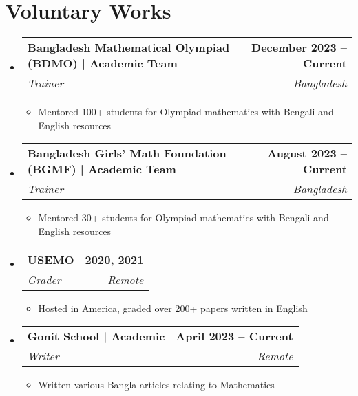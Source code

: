 \documentclass[letterpaper,11pt]{article}
\makeatletter
\newcommand{\resumeItem}[1]{
  \item{
    {#1 \vspace{-2pt}}
  }
}
\newcommand{\resumeSubheading}[4]{
  \vspace{-2pt}\item
    \begin{tabular*}{1.0\textwidth}[t]{l@{\extracolsep{\fill}}r}
      \textbf{#1} & \textbf{\small #2} \\
      \textit{\small#3} & \textit{\small #4} \\
    \end{tabular*}\vspace{-7pt}
}
\newcommand{\resumeSubHeadingListStart}{\begin{itemize}[leftmargin=0.0in, label={}]}
\newcommand{\resumeSubHeadingListEnd}{\end{itemize}}
\newcommand{\resumeItemListStart}{\begin{itemize}}
\newcommand{\resumeItemListEnd}{\end{itemize}\vspace{-5pt}}
\makeatother
\begin{document}
\section{Voluntary Works}
    \resumeSubHeadingListStart
        \resumeSubheading
          {\textbf{Bangladesh Mathematical Olympiad (BDMO)} | Academic Team }{December 2023 -- Current}
          {Trainer}{Bangladesh}
          \resumeItemListStart
            \resumeItem{Mentored 100+ students for Olympiad mathematics with Bengali and English resources}
          \resumeItemListEnd
        \resumeSubheading
          {\textbf{Bangladesh Girls' Math Foundation (BGMF)}  | Academic Team}{August 2023 -- Current}
          {Trainer}{Bangladesh}
          \resumeItemListStart
            \resumeItem{Mentored 30+ students for Olympiad mathematics with Bengali and English resources}
          \resumeItemListEnd
    
        \resumeSubheading
          {\textbf{USEMO} }{2020, 2021}
          {Grader}{Remote}
          \resumeItemListStart
            \resumeItem{Hosted in America, graded over 200+ papers written in English }
          \resumeItemListEnd

        \resumeSubheading
          {\textbf{Gonit School} | Academic  }{April 2023 -- Current}
          {Writer}{Remote}
          \resumeItemListStart
            \resumeItem{Written various Bangla articles relating to Mathematics}
          \resumeItemListEnd

    \resumeSubHeadingListEnd
\end{document}
